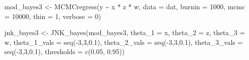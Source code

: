 \documentclass[
  letterpaper,
  DIV=11,
  numbers=noendperiod]{scrartcl}
\newenvironment{Shaded}{\begin{snugshade}}{\end{snugshade}}
\newcommand{\AttributeTok}[1]{\textcolor[rgb]{0.40,0.45,0.13}{#1}}
\newcommand{\DecValTok}[1]{\textcolor[rgb]{0.68,0.00,0.00}{#1}}
\newcommand{\FloatTok}[1]{\textcolor[rgb]{0.68,0.00,0.00}{#1}}
\newcommand{\FunctionTok}[1]{\textcolor[rgb]{0.28,0.35,0.67}{#1}}
\newcommand{\NormalTok}[1]{\textcolor[rgb]{0.00,0.23,0.31}{#1}}
\newcommand{\OtherTok}[1]{\textcolor[rgb]{0.00,0.23,0.31}{#1}}
\newcommand{\SpecialCharTok}[1]{\textcolor[rgb]{0.37,0.37,0.37}{#1}}
\newcommand{\StringTok}[1]{\textcolor[rgb]{0.13,0.47,0.30}{#1}}
\begin{document}
\begin{Shaded}
\begin{Highlighting}[]
\NormalTok{mod\_bayes3 }\OtherTok{\textless{}{-}} \FunctionTok{MCMCregress}\NormalTok{(y }\SpecialCharTok{\textasciitilde{}}\NormalTok{ x }\SpecialCharTok{*}\NormalTok{ z }\SpecialCharTok{*}\NormalTok{ w, }\AttributeTok{data =}\NormalTok{ dat,}
                          \AttributeTok{burnin =} \DecValTok{1000}\NormalTok{, }\AttributeTok{mcmc =} \DecValTok{10000}\NormalTok{, }\AttributeTok{thin =} \DecValTok{1}\NormalTok{,}
                          \AttributeTok{verbose =} \DecValTok{0}\NormalTok{)}


\NormalTok{jnk\_bayes3 }\OtherTok{\textless{}{-}} \FunctionTok{JNK\_bayes}\NormalTok{(mod\_bayes3, }
                        \AttributeTok{theta\_1 =} \StringTok{\textquotesingle{}x\textquotesingle{}}\NormalTok{, }
                        \AttributeTok{theta\_2 =} \StringTok{\textquotesingle{}z\textquotesingle{}}\NormalTok{,}
                        \AttributeTok{theta\_3 =} \StringTok{\textquotesingle{}w\textquotesingle{}}\NormalTok{,}
                        \AttributeTok{theta\_1\_vals =} \FunctionTok{seq}\NormalTok{(}\SpecialCharTok{{-}}\DecValTok{3}\NormalTok{,}\DecValTok{3}\NormalTok{,}\FloatTok{0.1}\NormalTok{), }
                        \AttributeTok{theta\_2\_vals =} \FunctionTok{seq}\NormalTok{(}\SpecialCharTok{{-}}\DecValTok{3}\NormalTok{,}\DecValTok{3}\NormalTok{,}\FloatTok{0.1}\NormalTok{), }
                        \AttributeTok{theta\_3\_vals =} \FunctionTok{seq}\NormalTok{(}\SpecialCharTok{{-}}\DecValTok{3}\NormalTok{,}\DecValTok{3}\NormalTok{,}\FloatTok{0.1}\NormalTok{),}
                        \AttributeTok{thresholds =} \FunctionTok{c}\NormalTok{(}\FloatTok{0.05}\NormalTok{, }\FloatTok{0.95}\NormalTok{))}
\end{Highlighting}
\end{Shaded}
\end{document}
